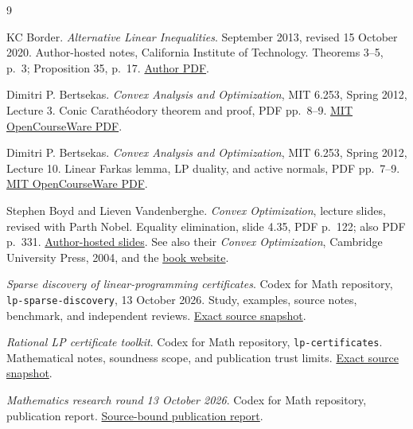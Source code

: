 \documentclass[11pt,letterpaper]{article}
\theoremstyle{definition}
\theoremstyle{remark}
\numberwithin{equation}{section}
\begin{document}
\begin{thebibliography}{9}
\small

KC Border.
\emph{Alternative Linear Inequalities}.
September 2013, revised 15 October 2020.
Author-hosted notes, California Institute of Technology.
Theorems 3--5, p.~3; Proposition 35, p.~17.
\href{https://kcborder.caltech.edu/Notes/Alternative.pdf}
{Author PDF}.

Dimitri P. Bertsekas.
\emph{Convex Analysis and Optimization}, MIT 6.253, Spring 2012,
Lecture 3. Conic Carath\'eodory theorem and proof, PDF pp.~8--9.
\href{https://ocw.mit.edu/courses/6-253-convex-analysis-and-optimization-spring-2012/3e2a100d7fa327637ed8e31771a22c18_MIT6_253S12_lec03.pdf}
{MIT OpenCourseWare PDF}.

Dimitri P. Bertsekas.
\emph{Convex Analysis and Optimization}, MIT 6.253, Spring 2012,
Lecture 10. Linear Farkas lemma, LP duality, and active normals,
PDF pp.~7--9.
\href{https://ocw.mit.edu/courses/6-253-convex-analysis-and-optimization-spring-2012/9f80ea2051c10cc0f8cf3839983c381a_MIT6_253S12_lec10.pdf}
{MIT OpenCourseWare PDF}.

Stephen Boyd and Lieven Vandenberghe.
\emph{Convex Optimization}, lecture slides, revised with Parth Nobel.
Equality elimination, slide 4.35, PDF p.~122; also PDF p.~331.
\href{https://web.stanford.edu/~boyd/cvxbook/bv_cvxslides.pdf}
{Author-hosted slides}.
See also their \emph{Convex Optimization}, Cambridge University Press, 2004,
and the \href{https://web.stanford.edu/~boyd/cvxbook/}{book website}.

\emph{Sparse discovery of linear-programming certificates}.
Codex for Math repository, \texttt{lp-sparse-discovery}, 13 October 2026.
Study, examples, source notes, benchmark, and independent reviews.
\href{https://github.com/Drsunflowerherbert/Codex-for-Math/tree/e4f337c3aa52ec4c3f2aab078d7c91b32ee0015f/lp-sparse-discovery}
{Exact source snapshot}.

\emph{Rational LP certificate toolkit}.
Codex for Math repository, \texttt{lp-certificates}.
Mathematical notes, soundness scope, and publication trust limits.
\href{https://github.com/Drsunflowerherbert/Codex-for-Math/tree/e4f337c3aa52ec4c3f2aab078d7c91b32ee0015f/lp-certificates}
{Exact source snapshot}.

\emph{Mathematics research round 13 October 2026}.
Codex for Math repository, publication report.
\href{https://github.com/Drsunflowerherbert/Codex-for-Math/blob/e4f337c3aa52ec4c3f2aab078d7c91b32ee0015f/publication/ROUND-2026-10-13.md}
{Source-bound publication report}.

\end{thebibliography}
\end{document}
